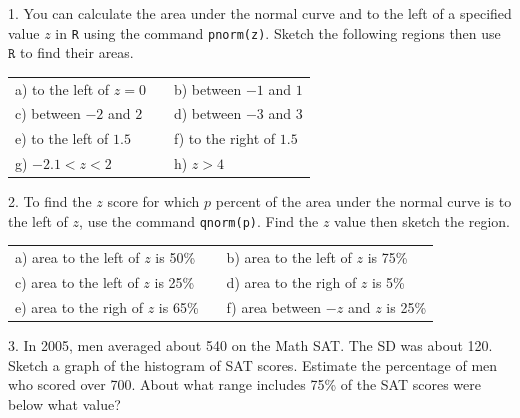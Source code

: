 \documentclass[10pt]{article}
\begin{document}
{1. You can calculate the area under the normal curve and to the left of a specified value
$z$ in \texttt{R} using the command \texttt{pnorm(z)}.  Sketch the following regions then
use $\texttt{R}$ to find their areas.\vspace{-4pt}
\begin{center}
\begin{tabular}{lcl}
a) to the left of $z=0$ &\hspace{3in} & b) between $-1$ and $1$\\[.7in]
c) between $-2$ and $2$ &\hspace{3in} & d) between $-3$ and $3$\\[.7in]
e) to the left of $1.5$ &\hspace{3in} & f) to the right of $1.5$\\[.7in]
g) $-2.1<z<2$ &\hspace{3in} & h) $z>4$\\
\end{tabular}
\end{center}
\vfill
\eject

2. To find the $z$ score for which $p$ percent of the area under the normal curve is
to the left of $z$, use the command \texttt{qnorm(p)}.
Find the $z$ value then sketch the region.
\begin{center}
\begin{tabular}{lcl}
a) area to the left of $z$ is 50\% &\hspace{2in} & b) area to the left of $z$ is 75\%\\[.7in]
c) area to the left of $z$ is 25\% &\hspace{2in} & d) area to the righ of $z$ is 5\%\\[.7in]
e) area to the righ of $z$ is 65\% &\hspace{2in} & f) area between $-z$ and $z$ is 25\%\\[.7in]
\end{tabular}
\end{center}

3. In 2005, men averaged about 540 on the Math SAT.  
The SD was about 120. 
Sketch a graph of the histogram of SAT scores.
Estimate the percentage of men who scored over 700.  
About what range includes 
75\% of the SAT scores were below what value?
\vspace{1.5in}


}
\end{document}
